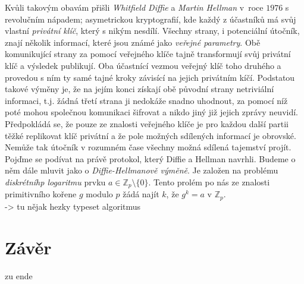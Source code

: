 \documentclass [12pt]{report}
\begin{document}
Kvůli takovým obavám přišli \textit{Whitfield Diffie} a \textit{Martin Hellman} v~roce $1976$ s revolučním nápadem; asymetrickou kryptografií, kde každý z účastníků má svůj vlastní \textit{privátní klíč}, který s nikým nesdílí. Všechny strany, i potenciální útočník, znají několik informací, které jsou známé jako \textit{veřejné parametry}. Obě komunikující strany za pomocí veřejného klíče tajně transformují svůj privátní klíč a výsledek publikují. Oba účastnící vezmou veřejný klíč toho druhého a provedou s ním ty samé tajné kroky závisící na jejich privátním kíčí. Podstatou takové výměny je, že na jejím konci získají obě původní strany netriviální informaci, t.j. žádná třetí strana ji nedokáže snadno uhodnout, za pomocí níž poté mohou společnou komunikaci šifrovat a nikdo jiný již jejich zprávy neuvidí. Předpokládá se, že pouze ze znalosti veřejného klíče je pro každou další partii těžké replikovat klíč privátní a že pole možných sdílených informací je obrovské. Nemůže tak útočník v rozumném čase všechny možná sdílená tajemství projít.\\

Pojďme se podívat na právě protokol, který Diffie a Hellman navrhli. Budeme o něm dále mluvit jako o \textit{Diffie-Hellmanově výměně}. Je založen na problému \textit{diskrétníhp logaritmu} prvku $a \in \mathbb{Z}_p \setminus \lbrace 0 \rbrace$. Tento prolém po nás ze znalosti primitivního kořene $g$ modulo $p$ žádá najít $k$, že $g^k = a$ v $\mathbb{Z}_p$.\\


-> tu nějak hezky typeset algoritmus



\chapter*{Závěr}
zu ende
\end{document}
